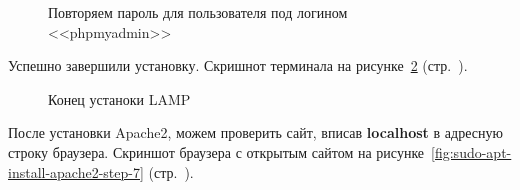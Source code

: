 \begin{figure}[p]
    \caption{Повторяем пароль для пользователя под логином <<phpmyadmin>>}
    \label{fig:sudo-apt-install-apache2-step-5}
\end{figure}

Успешно завершили установку.
Скришнот терминала на рисунке~\ref{fig:sudo-apt-install-apache2-step-6} (стр.~\pageref{fig:sudo-apt-install-apache2-step-6}).

\begin{figure}[p]
    \caption{Конец устаноки LAMP}
    \label{fig:sudo-apt-install-apache2-step-6}
\end{figure}

После установки Apache2, можем проверить сайт, вписав \textbf{localhost} в адресную строку браузера.
Скриншот браузера с открытым сайтом на рисунке~\ref{fig:sudo-apt-install-apache2-step-7} (стр.~\pageref{fig:sudo-apt-install-apache2-step-7}).

